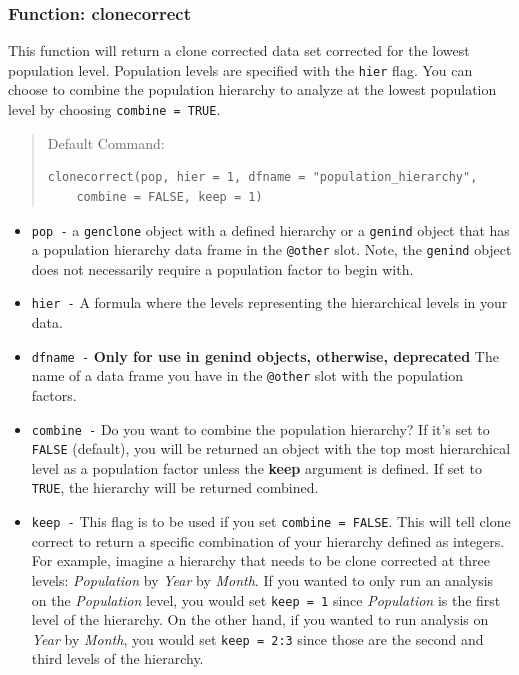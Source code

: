 \documentclass[letterpaper]{article}\usepackage[]{graphicx}\usepackage[]{color}
\makeatletter
\newenvironment{kframe}{%
 \def\at@end@of@kframe{}%
 \ifinner\ifhmode%
  \def\at@end@of@kframe{\end{minipage}}%
  \begin{minipage}{\columnwidth}%
 \fi\fi%
 \def\FrameCommand##1{\hskip\@totalleftmargin \hskip-\fboxsep
 \colorbox{shadecolor}{##1}\hskip-\fboxsep
     \hskip-\linewidth \hskip-\@totalleftmargin \hskip\columnwidth}%
 \MakeFramed {\advance\hsize-\width
   \@totalleftmargin\z@ \linewidth\hsize
   \@setminipage}}%
 {\par\unskip\endMakeFramed%
 \at@end@of@kframe}
\newenvironment{knitrout}{}{} %
\newcommand{\tab}{\hspace*{1em}}
\makeatother
\begin{document}
\subsubsection{Function: clonecorrect}\label{data.manip:cc:clonecorrect}

\tab\tab This function will return a clone corrected data set corrected for the
lowest population level. Population levels are specified with the \texttt{hier}
flag. You can choose to combine the population hierarchy to analyze at the
lowest population level by choosing \texttt{combine = TRUE}.

\begin{quote}
Default Command:
\begin{knitrout}
\color{fgcolor}\begin{kframe}
\begin{verbatim}
clonecorrect(pop, hier = 1, dfname = "population_hierarchy", 
    combine = FALSE, keep = 1)
\end{verbatim}
\end{kframe}
\end{knitrout}

\end{quote}
\begin{itemize}
  \item \texttt{pop -} a \texttt{genclone} object with a defined hierarchy or a
   \texttt{genind} object that has a population hierarchy data frame in the 
   \texttt{@other} slot. Note, the \texttt{genind} object does not necessarily 
   require a population factor to begin with. 
  \item \texttt{hier -} A formula where the levels representing the hierarchical
   levels in your data. 
  \item \texttt{dfname -} \textbf{Only for use in genind objects, otherwise, deprecated}
   The name of a data frame you have in the \texttt{@other} slot with the population factors. 
  \item \texttt{combine -} Do you want to combine the population hierarchy? 
   If it's set to \texttt{FALSE} (default), you will be returned an object with 
   the top most hierarchical level as a population factor unless the \textbf{keep}
   argument is defined. If set to \texttt{TRUE}, the hierarchy will be returned
   combined. 
  \item \texttt{keep -} This flag is to be used if you set \texttt{combine = FALSE}. 
   This will tell clone correct to return a specific combination of your hierarchy
   defined as integers.
   For example, imagine a hierarchy that needs to be clone corrected at three levels: 
   \textit{Population} by \textit{Year} by \textit{Month}. If you wanted to only 
   run an analysis on the \textit{Population} level, you would set \texttt{keep = 1} 
   since \textit{Population} is the first level of the hierarchy. On the other hand, 
   if you wanted to run analysis on \textit{Year} by \textit{Month}, you would set 
   \texttt{keep = 2:3} since those are the second and third levels of the hierarchy. 
\end{itemize}
\end{document}
